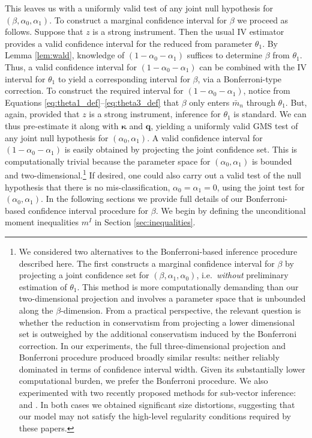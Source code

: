This leaves us with a uniformly valid test of any joint null hypothesis for $(\beta, \alpha_0, \alpha_1)$.
To construct a marginal confidence interval for $\beta$ we proceed as follows.
Suppose that $z$ is a strong instrument.
Then the usual IV estimator provides a valid confidence interval for the reduced from parameter $\theta_1$.
By Lemma \ref{lem:wald}, knowledge of $(1 - \alpha_0 - \alpha_1)$ suffices to determine $\beta$ from $\theta_1$.
Thus, a valid confidence interval for $(1 - \alpha_0 - \alpha_1)$ can be combined with the IV interval for $\theta_1$ to yield a corresponding interval for $\beta$, via a Bonferroni-type correction.
To construct the required interval for $(1 - \alpha_0 - \alpha_1)$, notice from Equations \ref{eq:theta1_def}--\ref{eq:theta3_def} that $\beta$ only enters $\bar{m}_n$ through $\theta_1$.
But, again, provided that $z$ is a strong instrument, inference for $\theta_1$ is standard.
We can thus pre-estimate it along with $\boldsymbol{\kappa}$ and $\mathbf{q}$, yielding a uniformly valid GMS test of any joint null hypothesis for $(\alpha_0, \alpha_1)$.
A valid confidence interval for $(1 - \alpha_0 - \alpha_1)$ is easily obtained by projecting the joint confidence set.
This is computationally trivial because the parameter space for $(\alpha_0, \alpha_1)$ is bounded and two-dimensional.\footnote{We considered two alternatives to the Bonferroni-based inference procedure described here.
  The first constructs a marginal confidence interval for $\beta$ by projecting a joint confidence set for $(\beta, \alpha_1, \alpha_0)$, i.e.\ \emph{without} preliminary estimation of $\theta_1$.
This method is more computationally demanding than our two-dimensional projection and involves a parameter space that is unbounded along the $\beta$-dimension.
From a practical perspective, the relevant question is whether the reduction in conservatism from projecting a lower dimensional set is outweighed by the additional conservatism induced by the Bonferroni correction. 
In our experiments, the full three-dimensional projection and Bonferroni procedure produced broadly similar results: neither reliably dominated in terms of confidence interval width.
Given its substantially lower computational burden, we prefer the Bonferroni procedure.
We also experimented with two recently proposed methods for sub-vector inference: \cite{kaido2016confidence} and \cite{BugniCanayShi}. In both cases we obtained significant size distortions, suggesting that our model may not satisfy the high-level regularity conditions required by these papers.}
If desired, one could also carry out a valid test of the null hypothesis that there is no mis-classification, $\alpha_0 = \alpha_1 = 0$, using the joint test for $(\alpha_0, \alpha_1)$. 
In the following sections we provide full details of our Bonferroni-based confidence interval procedure for $\beta$.
We begin by defining the unconditional moment inequalities $m^I$ in Section \ref{sec:inequalities}.



